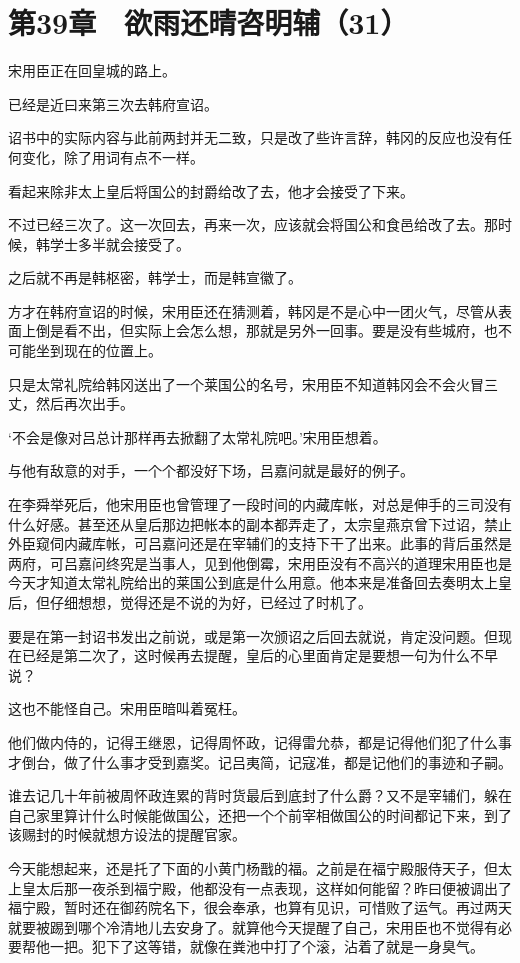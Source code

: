 \section{第39章　欲雨还晴咨明辅（31）}

宋用臣正在回皇城的路上。

已经是近曰来第三次去韩府宣诏。

诏书中的实际内容与此前两封并无二致，只是改了些许言辞，韩冈的反应也没有任何变化，除了用词有点不一样。

看起来除非太上皇后将国公的封爵给改了去，他才会接受了下来。

不过已经三次了。这一次回去，再来一次，应该就会将国公和食邑给改了去。那时候，韩学士多半就会接受了。

之后就不再是韩枢密，韩学士，而是韩宣徽了。

方才在韩府宣诏的时候，宋用臣还在猜测着，韩冈是不是心中一团火气，尽管从表面上倒是看不出，但实际上会怎么想，那就是另外一回事。要是没有些城府，也不可能坐到现在的位置上。

只是太常礼院给韩冈送出了一个莱国公的名号，宋用臣不知道韩冈会不会火冒三丈，然后再次出手。

‘不会是像对吕总计那样再去掀翻了太常礼院吧。’宋用臣想着。

与他有敌意的对手，一个个都没好下场，吕嘉问就是最好的例子。

在李舜举死后，他宋用臣也曾管理了一段时间的内藏库帐，对总是伸手的三司没有什么好感。甚至还从皇后那边把帐本的副本都弄走了，太宗皇燕京曾下过诏，禁止外臣窥伺内藏库帐，可吕嘉问还是在宰辅们的支持下干了出来。此事的背后虽然是两府，可吕嘉问终究是当事人，见到他倒霉，宋用臣没有不高兴的道理宋用臣也是今天才知道太常礼院给出的莱国公到底是什么用意。他本来是准备回去奏明太上皇后，但仔细想想，觉得还是不说的为好，已经过了时机了。

要是在第一封诏书发出之前说，或是第一次颁诏之后回去就说，肯定没问题。但现在已经是第二次了，这时候再去提醒，皇后的心里面肯定是要想一句为什么不早说？

这也不能怪自己。宋用臣暗叫着冤枉。

他们做内侍的，记得王继恩，记得周怀政，记得雷允恭，都是记得他们犯了什么事才倒台，做了什么事才受到嘉奖。记吕夷简，记寇准，都是记他们的事迹和子嗣。

谁去记几十年前被周怀政连累的背时货最后到底封了什么爵？又不是宰辅们，躲在自己家里算计什么时候能做国公，还把一个个前宰相做国公的时间都记下来，到了该赐封的时候就想方设法的提醒官家。

今天能想起来，还是托了下面的小黄门杨戬的福。之前是在福宁殿服侍天子，但太上皇太后那一夜杀到福宁殿，他都没有一点表现，这样如何能留？昨曰便被调出了福宁殿，暂时还在御药院名下，很会奉承，也算有见识，可惜败了运气。再过两天就要被踢到哪个冷清地儿去安身了。就算他今天提醒了自己，宋用臣也不觉得有必要帮他一把。犯下了这等错，就像在粪池中打了个滚，沾着了就是一身臭气。


